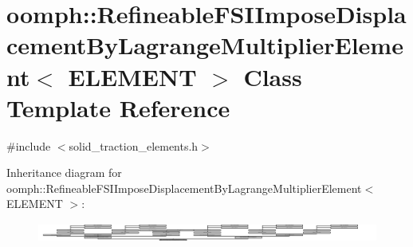 \hypertarget{classoomph_1_1RefineableFSIImposeDisplacementByLagrangeMultiplierElement}{}\section{oomph\+:\+:Refineable\+F\+S\+I\+Impose\+Displacement\+By\+Lagrange\+Multiplier\+Element$<$ E\+L\+E\+M\+E\+NT $>$ Class Template Reference}
\label{classoomph_1_1RefineableFSIImposeDisplacementByLagrangeMultiplierElement}


{\ttfamily \#include $<$solid\+\_\+traction\+\_\+elements.\+h$>$}

Inheritance diagram for oomph\+:\+:Refineable\+F\+S\+I\+Impose\+Displacement\+By\+Lagrange\+Multiplier\+Element$<$ E\+L\+E\+M\+E\+NT $>$\+:\begin{figure}[H]
\begin{center}
\leavevmode
\includegraphics[height=0.649437cm]{classoomph_1_1RefineableFSIImposeDisplacementByLagrangeMultiplierElement}
\end{center}
\end{figure}
